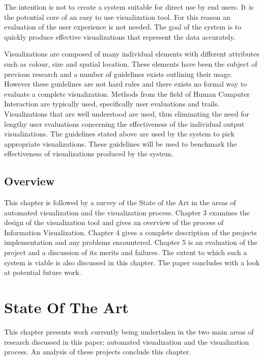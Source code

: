 \documentclass[a4paper, 11pt, titlepage, onehalfspacing]{report}
\begin{document}
The intention is not to create a system suitable for direct use by end users. It is the potential core of an easy to use visualization tool. For this reason an evaluation of the user experience is not needed. The goal of the system is to quickly produce effective visualizations that represent the data accurately.

Visualizations are composed of many individual elements with different attributes such as colour, size and spatial location. These elements have been the subject of previous research and a number of guidelines exists outlining their usage. However these guidelines are not hard rules and there exists no formal way to evaluate a complete visualization. Methods from the field of Human Computer Interaction are typically used, specifically user evaluations and trails. Visualizations that are well understood are used, thus eliminating the need for lengthy user evaluations concerning the effectiveness of the individual output visualizations. The guidelines stated above are used by the system to pick appropriate visualizations. These guidelines will be used to benchmark the effectiveness of visualizations produced by the system.

	\section{Overview}
 
This chapter is followed by a survey of the State of the Art in the areas of automated visualization and the visualization process. Chapter 3 examines the design of the visualization tool and gives an overview of the process of Information Visualization. Chapter 4 gives a complete description of the projects implementation and any problems encountered. Chapter 5 is an evaluation of the project and a discussion of its merits and failures. The extent to which such a system is viable is also discussed in this chapter. The paper concludes with a look at potential future work.


	\chapter{State Of The Art}

This chapter presents work currently being undertaken in the two main areas of research discussed in this paper; automated visualization and the visualization process. An analysis of these projects conclude this chapter.
\end{document}

